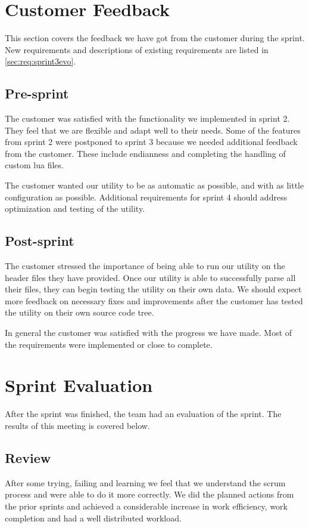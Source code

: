 \section{Customer Feedback}
\label{sec:sp3:feedback}
This section covers the feedback we have got from the customer during the 
sprint. New requirements and descriptions of existing requirements are
listed in \autoref{sec:req:sprint3evo}.

\subsection{Pre-sprint}
The customer was satisfied with the functionality we implemented in sprint 2.
They feel that we are flexible and adapt well to their needs.
Some of the features from sprint 2 were postponed to sprint 3 because we
needed additional feedback from the customer. These include \gls{endianness}
and completing the handling of custom \Gls{lua} files.

The customer wanted our \gls{utility} to be as automatic as possible, and with
as little configuration as possible. Additional requirements for sprint 4 should
address optimization and testing of the \gls{utility}.

\subsection{Post-sprint}
The customer stressed the importance of being able to run our \gls{utility} on
the \gls{header} files they have provided. Once our \gls{utility} is able to
successfully parse all their files, they can begin testing the \gls{utility}
on their own data. We should expect more feedback on necessary fixes and
improvements after the customer has tested the \gls{utility} on their own
source code tree.

In general the customer was satisfied with the progress we have made. Most of
the requirements were implemented or close to complete.


\section{Sprint Evaluation}
\label{sec:sp3:eval}
After the sprint was finished, the team had an evaluation of the sprint. The 
results of this meeting is covered below.

\subsection{Review}
After some trying, failing and learning we feel that we understand the \Gls{scrum} process and were able to do it more correctly. We did the planned actions from the prior sprints and achieved a considerable increase in work efficiency, work completion and had a well distributed workload.

